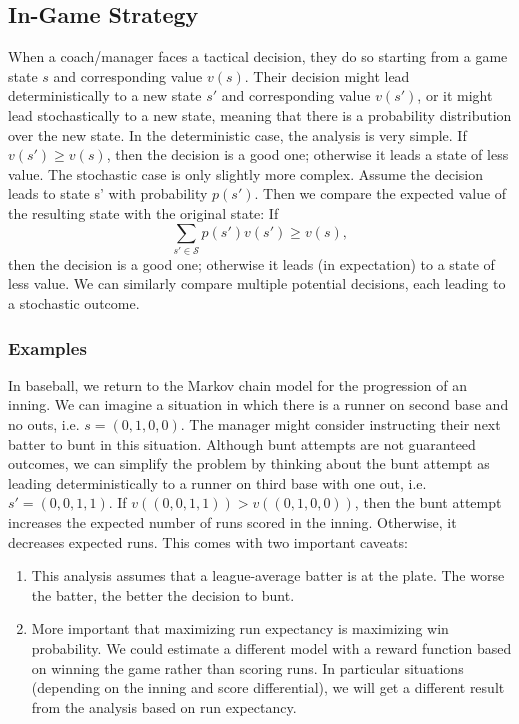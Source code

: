 \documentclass{article}
\begin{document}
    \subsection{\sc In-Game Strategy}

      When a coach/manager faces a tactical decision, they do so starting from a game state $s$ and corresponding value $v(s)$. Their decision might lead deterministically to a new state $s'$ and corresponding value $v(s')$, or it might lead stochastically to a new state, meaning that there is a probability distribution over the new state. In the deterministic case, the analysis is very simple. If $v(s') \ge v(s)$, then the decision is a good one; otherwise it leads a state of less value. The stochastic case is only slightly more complex. Assume the decision leads to state s' with probability $p(s')$. Then we compare the expected value of the resulting state with the original state: If
      $$\sum_{s' \in \mathcal S}p(s')v(s') \ge v(s),$$
      then the decision is a good one; otherwise it leads (in expectation) to a state of less value. We can similarly compare multiple potential decisions, each leading to a stochastic outcome.

      \subsubsection{\sc Examples}

      In baseball, we return to the Markov chain model for the progression of an inning. We can imagine a situation in which there is a runner on second base and no outs, i.e. $s = (0, 1, 0, 0)$. The manager might consider instructing their next batter to bunt in this situation. Although bunt attempts are not guaranteed outcomes, we can simplify the problem by thinking about the bunt attempt as leading deterministically to a runner on third base with one out, i.e. $s' = (0, 0, 1, 1)$. If $v((0, 0, 1, 1)) > v((0, 1, 0, 0))$, then the bunt attempt increases the expected number of runs scored in the inning. Otherwise, it decreases expected runs. This comes with two important caveats:
      \begin{enumerate}
        \item This analysis assumes that a league-average batter is at the plate. The worse the batter, the better the decision to bunt.
        \item More important that maximizing run expectancy is maximizing win probability. We could estimate a different model with a reward function based on winning the game rather than scoring runs. In particular situations (depending on the inning and score differential), we will get a different result from the analysis based on run expectancy.
      \end{enumerate}
\end{document}
